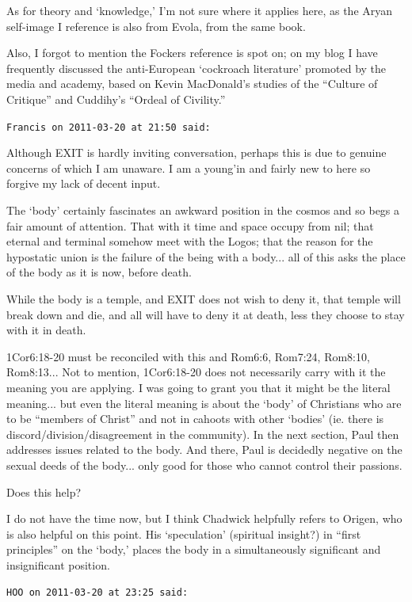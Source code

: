 \begin{footnotesize}
\begin{sffamily}
As for theory and `knowledge,' I'm not sure where it applies here, as the Aryan self-image I reference is also from Evola, from the same book.

Also, I forgot to mention the Fockers reference is spot on; on my blog I have frequently discussed the anti-European `cockroach literature' promoted by the media and academy, based on Kevin MacDonald's studies of the ``Culture of Critique'' and Cuddihy's ``Ordeal of Civility.''

\hfill

\texttt{Francis on 2011-03-20 at 21:50 said:}

Although EXIT is hardly inviting conversation, perhaps this is due to genuine concerns of which I am unaware. I am a young'in and fairly new to here so forgive my lack of decent input.

The `body' certainly fascinates an awkward position in the cosmos and so begs a fair amount of attention. That with it time and space occupy from nil; that eternal and terminal somehow meet with the Logos; that the reason for the hypostatic union is the failure of the being with a body... all of this asks the place of the body as it is now, before death.

While the body is a temple, and EXIT does not wish to deny it, that temple will break down and die, and all will have to deny it at death, less they choose to stay with it in death.

1Cor6:18-20 must be reconciled with this and Rom6:6, Rom7:24, Rom8:10, Rom8:13... Not to mention, 1Cor6:18-20 does not necessarily carry with it the meaning you are applying. I was going to grant you that it might be the literal meaning... but even the literal meaning is about the `body' of Christians who are to be ``members of Christ'' and not in cahoots with other `bodies' (ie. there is discord/division/disagreement in the community). In the next section, Paul then addresses issues related to the body. And there, Paul is decidedly negative on the sexual deeds of the body... only good for those who cannot control their passions.

Does this help?

I do not have the time now, but I think Chadwick helpfully refers to Origen, who is also helpful on this point. His `speculation' (spiritual insight?) in ``first principles'' on the `body,' places the body in a simultaneously significant and insignificant position.

\hfill

\texttt{HOO on 2011-03-20 at 23:25 said:}


\end{sffamily}
\end{footnotesize}
